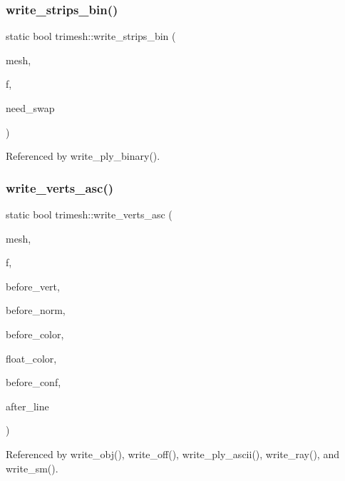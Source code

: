 \subsubsection{\texorpdfstring{write\+\_\+strips\+\_\+bin()}{write\_strips\_bin()}}
{\footnotesize\ttfamily static bool trimesh\+::write\+\_\+strips\+\_\+bin (\begin{DoxyParamCaption}\item[{\hyperlink{classtrimesh_1_1TriMesh}{Tri\+Mesh} $\ast$}]{mesh,  }\item[{F\+I\+LE $\ast$}]{f,  }\item[{bool}]{need\+\_\+swap }\end{DoxyParamCaption})\hspace{0.3cm}{\ttfamily [static]}}



Referenced by write\+\_\+ply\+\_\+binary().

\mbox{\label{namespacetrimesh_a2c61b5ad47a44a375a685a560ce2a65a}} 
\subsubsection{\texorpdfstring{write\+\_\+verts\+\_\+asc()}{write\_verts\_asc()}}
{\footnotesize\ttfamily static bool trimesh\+::write\+\_\+verts\+\_\+asc (\begin{DoxyParamCaption}\item[{\hyperlink{classtrimesh_1_1TriMesh}{Tri\+Mesh} $\ast$}]{mesh,  }\item[{F\+I\+LE $\ast$}]{f,  }\item[{const char $\ast$}]{before\+\_\+vert,  }\item[{const char $\ast$}]{before\+\_\+norm,  }\item[{const char $\ast$}]{before\+\_\+color,  }\item[{bool}]{float\+\_\+color,  }\item[{const char $\ast$}]{before\+\_\+conf,  }\item[{const char $\ast$}]{after\+\_\+line }\end{DoxyParamCaption})\hspace{0.3cm}{\ttfamily [static]}}



Referenced by write\+\_\+obj(), write\+\_\+off(), write\+\_\+ply\+\_\+ascii(), write\+\_\+ray(), and write\+\_\+sm().

